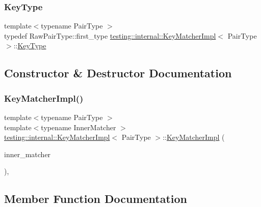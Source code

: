 \subsubsection{\texorpdfstring{Key\+Type}{KeyType}}
{\footnotesize\ttfamily template$<$typename Pair\+Type $>$ \\
typedef Raw\+Pair\+Type\+::first\+\_\+type \hyperlink{classtesting_1_1internal_1_1_key_matcher_impl}{testing\+::internal\+::\+Key\+Matcher\+Impl}$<$ Pair\+Type $>$\+::\hyperlink{classtesting_1_1internal_1_1_key_matcher_impl_a9bd63b699518bd9868ba24766547667a}{Key\+Type}}



\subsection{Constructor \& Destructor Documentation}
\mbox{\label{classtesting_1_1internal_1_1_key_matcher_impl_a9ad2a218b0366cae9fb09e82347bd8e7}} 
\subsubsection{\texorpdfstring{Key\+Matcher\+Impl()}{KeyMatcherImpl()}}
{\footnotesize\ttfamily template$<$typename Pair\+Type $>$ \\
template$<$typename Inner\+Matcher $>$ \\
\hyperlink{classtesting_1_1internal_1_1_key_matcher_impl}{testing\+::internal\+::\+Key\+Matcher\+Impl}$<$ Pair\+Type $>$\+::\hyperlink{classtesting_1_1internal_1_1_key_matcher_impl}{Key\+Matcher\+Impl} (\begin{DoxyParamCaption}\item[{Inner\+Matcher}]{inner\+\_\+matcher }\end{DoxyParamCaption})\hspace{0.3cm}{\ttfamily [inline]}, {\ttfamily [explicit]}}



\subsection{Member Function Documentation}
\mbox{\label{classtesting_1_1internal_1_1_key_matcher_impl_a4be87d136547063a16777151b691046d}} 
